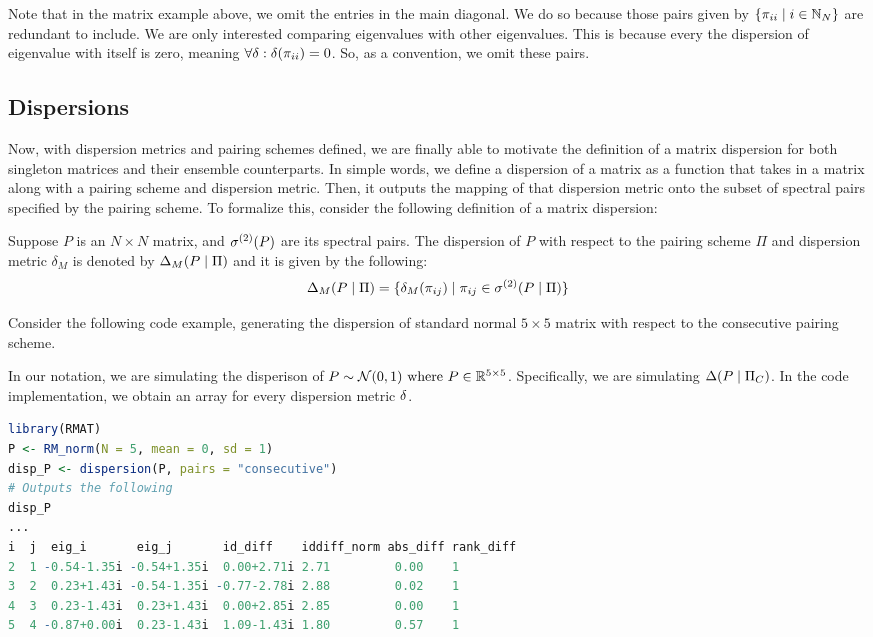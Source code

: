 \begin{remark}
Note that in the matrix example above, we omit the entries in the main diagonal. We do so because those pairs given by $\{\pi_{ii} \mid i \in \mathbb{N}_N\}$
are redundant to include. We are only interested comparing eigenvalues with other eigenvalues. This is because every the dispersion of eigenvalue with itself is zero,
meaning $\forall \delta : \delta(\pi_{ii}) = 0$. So, as a convention, we omit these pairs.
\end{remark}

\subsection{Dispersions}

Now, with dispersion metrics and pairing schemes defined, we are finally able to motivate the definition of a matrix dispersion for both singleton matrices and their ensemble counterparts.
In simple words, we define a dispersion of a matrix as a function that takes in a matrix along with a pairing scheme and dispersion metric.
Then, it outputs the mapping of that dispersion metric onto the subset of spectral pairs specified by the pairing scheme.
To formalize this, consider the following definition of a matrix dispersion:

\begin{definition}[Dispersion]
Suppose $P$ is an $N \times N$ matrix, and ${\sigma^{(2)}}(P)$ are its spectral pairs.
The dispersion of $P$ with respect to the pairing scheme $\Pi$ and dispersion metric $\delta_M$ is denoted by $\Delta_M(P \mid \Pi)$ and it is given by the following:
$$\Delta_M(P \mid \Pi) = \{\delta_M({\pi_{ij}}) \mid {\pi_{ij}} \in {\sigma^{(2)}}(P \mid \Pi)\}$$
\end{definition}

Consider the following code example, generating the dispersion of standard normal $5 \times 5$ matrix with respect to the consecutive pairing scheme.

\begin{code}
In our notation, we are simulating the disperison of $P \sim \mathcal{N}(0,1) \text{ where } P \in \mathbb{R}^{5 \times 5}$.
Specifically, we are simulating $\Delta(P \mid \Pi_C)$. In the code implementation, we obtain an array for every dispersion metric $\delta$.
\end{code}
\begin{lstlisting}[language=R]
library(RMAT)
P <- RM_norm(N = 5, mean = 0, sd = 1)
disp_P <- dispersion(P, pairs = "consecutive")
# Outputs the following
disp_P
...
i  j  eig_i       eig_j       id_diff    iddiff_norm abs_diff rank_diff
2  1 -0.54-1.35i -0.54+1.35i  0.00+2.71i 2.71         0.00    1
3  2  0.23+1.43i -0.54-1.35i -0.77-2.78i 2.88         0.02    1
4  3  0.23-1.43i  0.23+1.43i  0.00+2.85i 2.85         0.00    1
5  4 -0.87+0.00i  0.23-1.43i  1.09-1.43i 1.80         0.57    1
\end{lstlisting}

